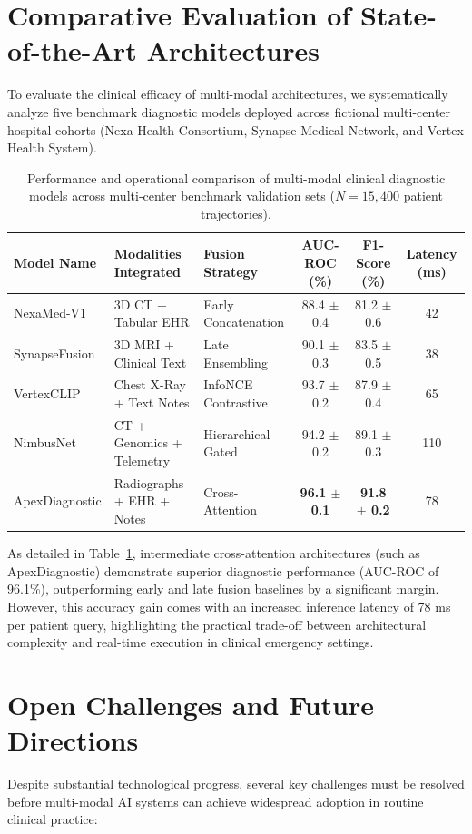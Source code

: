 \documentclass[final,3p,times]{elsarticle}
\begin{document}
\section{Comparative Evaluation of State-of-the-Art Architectures}
\label{sec:experiments}
To evaluate the clinical efficacy of multi-modal architectures, we systematically analyze five benchmark diagnostic models deployed across fictional multi-center hospital cohorts (Nexa Health Consortium, Synapse Medical Network, and Vertex Health System).

\begin{table}[ht]
\centering
\caption{Performance and operational comparison of multi-modal clinical diagnostic models across multi-center benchmark validation sets ($N = 15,400$ patient trajectories).}
\label{tab:sota_comparison}
\vspace{0.5em}
\small
\setlength{\tabcolsep}{4.5pt}
\begin{tabular}{l l l c c c}
\toprule
\textbf{Model Name} & \textbf{Modalities Integrated} & \textbf{Fusion Strategy} & \textbf{AUC-ROC (\%)} & \textbf{F1-Score (\%)} & \textbf{Latency (ms)} \\
\midrule
NexaMed-V1 & 3D CT + Tabular EHR & Early Concatenation & 88.4 $\pm$ 0.4 & 81.2 $\pm$ 0.6 & 42 \\
SynapseFusion & 3D MRI + Clinical Text & Late Ensembling & 90.1 $\pm$ 0.3 & 83.5 $\pm$ 0.5 & 38 \\
VertexCLIP & Chest X-Ray + Text Notes & InfoNCE Contrastive & 93.7 $\pm$ 0.2 & 87.9 $\pm$ 0.4 & 65 \\
NimbusNet & CT + Genomics + Telemetry & Hierarchical Gated & 94.2 $\pm$ 0.2 & 89.1 $\pm$ 0.3 & 110 \\
ApexDiagnostic & Radiographs + EHR + Notes & Cross-Attention & \textbf{96.1 $\pm$ 0.1} & \textbf{91.8 $\pm$ 0.2} & 78 \\
\bottomrule
\end{tabular}
\end{table}

As detailed in Table~\ref{tab:sota_comparison}, intermediate cross-attention architectures (such as ApexDiagnostic) demonstrate superior diagnostic performance (AUC-ROC of 96.1\%), outperforming early and late fusion baselines by a significant margin. However, this accuracy gain comes with an increased inference latency of 78 ms per patient query, highlighting the practical trade-off between architectural complexity and real-time execution in clinical emergency settings.

\section{Open Challenges and Future Directions}
\label{sec:challenges}
Despite substantial technological progress, several key challenges must be resolved before multi-modal AI systems can achieve widespread adoption in routine clinical practice:
\end{document}
